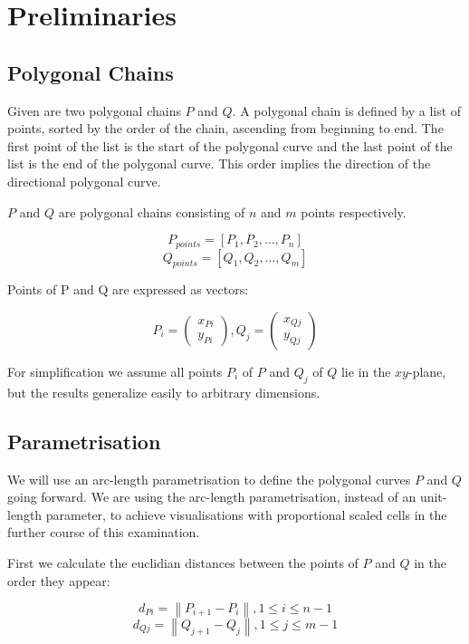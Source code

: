 \section{Preliminaries}
\subsection{Polygonal Chains}

Given are two polygonal chains $P$ and $Q$. A polygonal chain is defined by a list of points, sorted by the order of the chain, ascending from beginning to end. The first point of the list is the start of the polygonal curve and the last point of the list is the end of the polygonal curve. This order implies the direction of the directional polygonal curve.

$P$ and $Q$ are polygonal chains consisting of $n$ and $m$ points respectively.

$$P_{points} = [P_1, P_2, …, P_n]$$
$$Q_{points} = [Q_1, Q_2, …, Q_m]$$

Points of P and Q are expressed as vectors:

$$P_{i} = \begin{pmatrix}x_{Pi} \\ y_{Pi}\end{pmatrix}, Q_{j} = \begin{pmatrix}x_{Qj} \\ y_{Qj}\end{pmatrix}$$

For simplification we assume all points $P_{i}$ of $P$ and $Q_{j}$ of $Q$ lie in the $xy$-plane, but the results generalize easily to arbitrary dimensions\cite{rotelex}.

\subsection{Parametrisation}

We will use an arc-length parametrisation to define the polygonal curves $P$ and $Q$ going forward. We are using the arc-length parametrisation, instead of an unit-length parameter, to achieve visualisations with proportional scaled cells in the further course of this examination.

First we calculate the euclidian distances between the points of $P$ and $Q$ in the order they appear:

$$d_{Pi} = \left\|P_{i+1} - P_{i}\right\|, 1 \leq i \leq n-1$$
$$d_{Qj} = \left\|Q_{j+1} - Q_{j}\right\|, 1 \leq j \leq m-1$$

